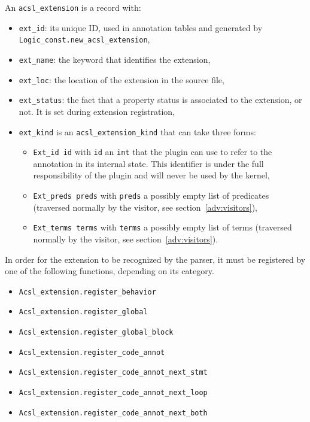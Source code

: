 An \texttt{acsl\_extension} is a record
with:
\begin{itemize}
  \item \texttt{ext\_id}: its unique ID, used in annotation tables and generated
        by \texttt{Logic\_const.new\_acsl\_extension},
  \item \texttt{ext\_name}: the keyword that identifies the extension,
  \item \texttt{ext\_loc}: the location of the extension in the source file,
  \item \texttt{ext\_status}: the fact that a property status is associated to
        the extension, or not. It is set during extension registration,
  \item \texttt{ext\_kind} is an \texttt{acsl\_extension\_kind}
        that can take three forms:
        \begin{itemize}
          \item \texttt{Ext\_id id} with \texttt{id} an \texttt{int}
                that the plugin can use to refer to the annotation in its
                internal state. This identifier is under the full responsibility
                of the plugin and will never be used by the kernel,
          \item \texttt{Ext\_preds preds} with \texttt{preds} a possibly empty
                list of predicates (traversed normally by the visitor,
                see section~\ref{adv:visitors}),
          \item \texttt{Ext\_terms terms} with \texttt{terms} a possibly empty
                list of terms (traversed normally by the visitor,
                see section~\ref{adv:visitors}).
        \end{itemize}
\end{itemize}

In order for the extension to be recognized by the parser, it must be
registered by one of the following functions, depending on its category.
\begin{itemize}
\item \texttt{Acsl\_extension.register\_behavior}%
\item \texttt{Acsl\_extension.register\_global}%
\item \texttt{Acsl\_extension.register\_global\_block}%
\item \texttt{Acsl\_extension.register\_code\_annot}%
\item \texttt{Acsl\_extension.register\_code\_annot\_next\_stmt}%
\item \texttt{Acsl\_extension.register\_code\_annot\_next\_loop}%
\item \texttt{Acsl\_extension.register\_code\_annot\_next\_both}%
\end{itemize}

